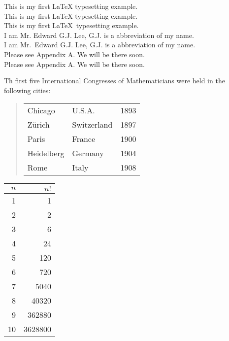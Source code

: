 \documentclass{report}
\begin{document}
This is my first {\LaTeX} typesetting example.\\
This is my first \LaTeX{} typesetting example.\\
This is my first \LaTeX\ typesetting example.\\
I am Mr. Edward G.J. Lee, G.J. is a abbreviation of my name.\\
I am Mr.\ Edward G.J. Lee, G.J. is a abbreviation of my name.\\
Please see Appendix A. We will be there soon.\\
Please see Appendix A\null. We will be there soon.

Th first five International Congresses of Mathematicians
were held in the following cities:
\begin{quote}
\begin{tabular}{lll}
Chicago&U.S.A.&1893\\
Z\"{u}rich&Switzerland&1897\\
Paris&France&1900\\
Heidelberg&Germany&1904\\
Rome&Italy&1908
\end{tabular}
\end{quote}

\begin{tabular}{|r|r|}
\hline
$n$&$n!$\\
\hline
1&1\\
2&2\\
3&6\\
4&24\\
5&120\\
6&720\\
7&5040\\
8&40320\\
9&362880\\
10&3628800\\
\hline
\end{tabular}
\end{document}
